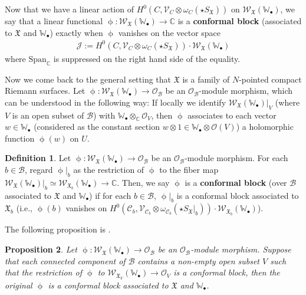 \documentclass[12pt,a4paper,notitlepage]{article}
\theoremstyle{definition}
\newtheorem{df}{Definition}[section]
\theoremstyle{plain}
\newtheorem{pp}[df]{Proposition}
\newcommand{\fk}{\mathfrak}
\newcommand{\mc}{\mathcal}
\newcommand{\Span}{\mathrm{Span}}
\newcommand{\scr}{\mathscr}
\newcommand{\SX}{{S_{\fk X}}}
\newcommand{\blt}{\bullet}
\newcommand{\Wbb}{\mathbb W}
\newcommand{\Cbb}{\mathbb C}
\numberwithin{equation}{section}
\begin{document}
Now that we have a linear action of $H^0(C,\scr V_C\otimes\omega_C(\star\SX))$ on $\scr W_{\fk X}(\Wbb_\blt)$, we say that a linear functional $\upphi:\scr W_{\fk X}(\Wbb_\blt)\rightarrow\Cbb$ is a \textbf{conformal block} (associated to $\fk X$ and $\Wbb_\blt$) exactly when $\upphi$ vanishes on the vector space
\begin{align*}
\scr J:=H^0(C,\scr V_C\otimes\omega_C(\star\SX))\cdot \scr W_{\fk X}(\Wbb_\blt)
\end{align*}
where $\Span_\Cbb$ is suppressed on the right hand side of the equality. %

Now we come back to the general setting that $\fk X$ is a family of $N$-pointed compact Riemann surfaces. Let $\upphi:\scr W_{\fk X}(\Wbb_\blt)\rightarrow\scr O_{\mc B}$ be an $\scr O_{\mc B}$-module morphism, which can be understood in the following way: If locally we identify $\scr W_{\fk X}(\Wbb_\blt)|_V$ (where $V$ is an open subset of $\mc B$) with $\Wbb_\blt\otimes_\Cbb\scr O_V$, then $\upphi$ associates to each vector $w\in\Wbb_\blt$ (considered as the constant section $w\otimes 1\in\Wbb_\blt\otimes\scr O(V)$) a holomorphic function $\upphi(w)$ on $U$.


\begin{df}
Let $\upphi:\scr W_{\fk X}(\Wbb_\blt)\rightarrow\scr O_{\mc B}$ be an $\scr O_{\mc B}$-module morphism. For each $b\in\mc B$,  regard $\upphi|_b$ as the restriction of $\upphi$ to the fiber map $\scr W_{\fk X}(\Wbb_\blt)|_{b}\simeq\scr W_{\fk X_b}(\Wbb_\blt)\rightarrow\Cbb$. Then, we say $\upphi$  is  a \textbf{conformal block} (over $\mc B$ associated to $\fk X$ and $\Wbb_\blt$) if for each $b\in\mc B$, $\upphi|_b$ is a  conformal block associated to $\fk X_b$ (i.e., $\upphi(b)$ vanishes on $H^0(\mc C_b,\scr V_{\mc C_b}\otimes\omega_{\mc C_b}(\star\SX|_b))\cdot\scr W_{\fk X_b}(\Wbb_\blt)$).
\end{df}

The following proposition is \cite[Prop. 6.4]{Gui20}.

\begin{pp}\label{lb10}
Let $\upphi:\scr W_{\fk X}(\Wbb_\blt)\rightarrow\scr O_{\mc B}$ be an $\scr O_{\mc B}$-module morphism. Suppose that  each connected component of $\mc B$ contains a non-empty open subset $V$ such that the restriction of $\upphi$ to $\scr W_{\fk X_V}(\Wbb_\blt)\rightarrow\scr O_V$ is a conformal block, then the original $\upphi$ is a conformal block associated to $\fk X$ and $\Wbb_\blt$.
\end{pp}
\end{document}
